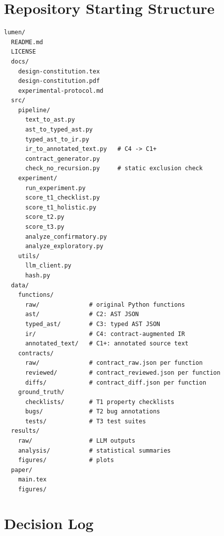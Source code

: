 \documentclass[11pt]{article}
\begin{document}
\section{Repository Starting Structure}
\label{sec:repo}

\begin{verbatim}
lumen/
  README.md
  LICENSE
  docs/
    design-constitution.tex
    design-constitution.pdf
    experimental-protocol.md
  src/
    pipeline/
      text_to_ast.py
      ast_to_typed_ast.py
      typed_ast_to_ir.py
      ir_to_annotated_text.py   # C4 -> C1+
      contract_generator.py
      check_no_recursion.py     # static exclusion check
    experiment/
      run_experiment.py
      score_t1_checklist.py
      score_t1_holistic.py
      score_t2.py
      score_t3.py
      analyze_confirmatory.py
      analyze_exploratory.py
    utils/
      llm_client.py
      hash.py
  data/
    functions/
      raw/              # original Python functions
      ast/              # C2: AST JSON
      typed_ast/        # C3: typed AST JSON
      ir/               # C4: contract-augmented IR
      annotated_text/   # C1+: annotated source text
    contracts/
      raw/              # contract_raw.json per function
      reviewed/         # contract_reviewed.json per function
      diffs/            # contract_diff.json per function
    ground_truth/
      checklists/       # T1 property checklists
      bugs/             # T2 bug annotations
      tests/            # T3 test suites
  results/
    raw/                # LLM outputs
    analysis/           # statistical summaries
    figures/            # plots
  paper/
    main.tex
    figures/
\end{verbatim}


\section{Decision Log}
\label{sec:decisions}
\end{document}
